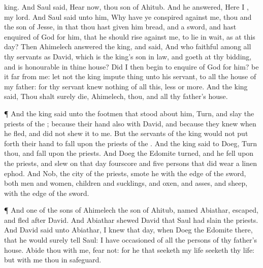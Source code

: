 {king.
And
Saul
said,
Hear now, thou
son of
Ahitub. And he
answered, Here I
{}, my
lord.
And
Saul
said unto him, Why have ye
conspired against me, thou and the
son of
Jesse, in that thou hast
given him
bread, and a
sword, and hast
enquired of
God for him, that he should
rise against me, to lie in
wait, as at this
day?
Then
Ahimelech
answered the
king, and
said, And who
{}
faithful among all thy
servants as
David, which is the
king’s son in
law, and
goeth at thy
bidding, and is
honourable in thine
house?
Did I
then
begin to
enquire of
God for him? be it far from
me: let not the
king
impute
{}
thing unto his
servant,
{} to all the
house of my
father: for thy
servant
knew
nothing of all this,
less or
more.
And the
king
said, Thou shalt
surely
die,
Ahimelech, thou, and all thy
father’s
house.
\par }{\PP {}¶ And the
king
said unto the
footmen that
stood about him,
Turn, and
slay the
priests of the
{}; because their
hand also
{} with
David, and because they
knew when he
fled, and did not
shew it to me. But the
servants of the
king
would not put
forth their
hand to
fall upon the
priests of the
{}.
And the
king
said to
Doeg,
Turn thou, and
fall upon the
priests. And
Doeg the
Edomite
turned, and he
fell upon the
priests, and
slew on that
day
fourscore and
five
persons that did
wear a
linen
ephod.
And
Nob, the
city of the
priests,
smote he with the
edge of the
sword, both
men and
women,
children and
sucklings, and
oxen, and
asses, and
sheep, with the
edge of the
sword.
\par }{\PP {}¶ And
one of the
sons of
Ahimelech the
son of
Ahitub,
named
Abiathar,
escaped, and
fled
after
David.
And
Abiathar
shewed
David that
Saul had
slain the
{}
priests.
And
David
said unto
Abiathar, I
knew
{} that
day, when
Doeg the
Edomite
{} there, that he would
surely
tell
Saul: I have
occasioned
{} of all the
persons of thy
father’s
house.
Abide thou with me,
fear not: for he that
seeketh my
life
seeketh thy
life: but with me thou
{} in
safeguard.

}
